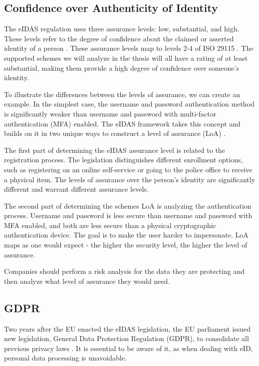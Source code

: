 \subsection{Confidence over Authenticity of Identity}

The eIDAS regulation uses three assurance levels: low, substantial, and high. These levels refer to the degree of confidence about the claimed or asserted identity of a person \cite{eulaw-eidas}. These assurance levels map to levels 2-4 of ISO 29115 \cite{iso29115}. The supported schemes we will analyze in the thesis will all have a rating of at least substantial, making them provide a high degree of confidence over someone's identity.

To illustrate the differences between the levels of assurance, we can create an example. In the simplest case, the {username and password} authentication method is significantly weaker than {username and password} with multi-factor authentication (MFA) enabled. The eIDAS framework takes this concept and builds on it in two unique ways to construct a level of assurance (LoA) \cite{eulaw-eidas-loa}.

The first part of determining the eIDAS assurance level is related to the registration process. The legislation distinguishes different enrollment options, such as registering on an online self-service or going to the police office to receive a physical item. The levels of assurance over the person's identity are significantly different and warrant different assurance levels.

The second part of determining the schemes LoA is analyzing the authentication process. {Username and password} is less secure than {username and password} with MFA enabled, and both are less secure than a physical cryptographic authentication device. The goal is to make the user harder to impersonate. LoA maps as one would expect - the higher the security level, the higher the level of assurance.

Companies should perform a risk analysis for the data they are protecting and then analyze what level of assurance they would need.

\subsection{GDPR}

Two years after the EU enacted the eIDAS legislation, the EU parliament issued new legislation, General Data Protection Regulation (GDPR), to consolidate all previous privacy laws \cite{eulaw-gdpr}. It is essential to be aware of it, as when dealing with eID, personal data processing is unavoidable. 


